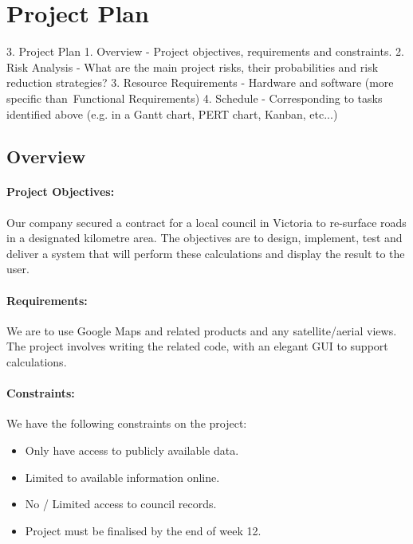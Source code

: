 \documentclass[a4paper,11pt]{article}
\begin{document}
\section{Project Plan}


3. Project Plan
  1. Overview - Project objectives, requirements and constraints.
  2. Risk Analysis - What are the main project risks, their probabilities and risk reduction strategies?
  3. Resource Requirements - Hardware and software (more specific than Functional Requirements)
  4. Schedule - Corresponding to tasks identified above (e.g. in a Gantt chart, PERT chart, Kanban, etc...)


\subsection{Overview}

\paragraph{Project Objectives:}

Our company secured a contract for a local council in Victoria to re-surface
roads in a designated kilometre area. The objectives are to design, implement,
test and deliver a system that will perform these calculations and display the
result to the user.

\paragraph{Requirements:}

We are to use Google Maps and related products and any satellite/aerial views.
The project involves writing the related code, with an elegant GUI to support
calculations. \autocite[2]{intro:1}

\paragraph{Constraints:}

We have the following constraints on the project:

\begin{itemize}
  \item Only have access to publicly available data.
  \item Limited to available information online.
  \item No / Limited access to council records.
  \item Project must be finalised by the end of week 12.
\end{itemize}
\end{document}
